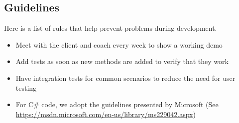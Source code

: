 \subsection{Guidelines}

Here is a list of rules that help prevent problems during development.

\begin{itemize}
	\item Meet with the client and coach every week to show a working demo
	\item Add tests as soon as new methods are added to verify that they work
	\item Have integration tests for common scenarios to reduce the need for user testing
	\item For C\# code, we adopt the guidelines presented by Microsoft
		  (See \url{https://msdn.microsoft.com/en-us/library/ms229042.aspx})
\end{itemize}
